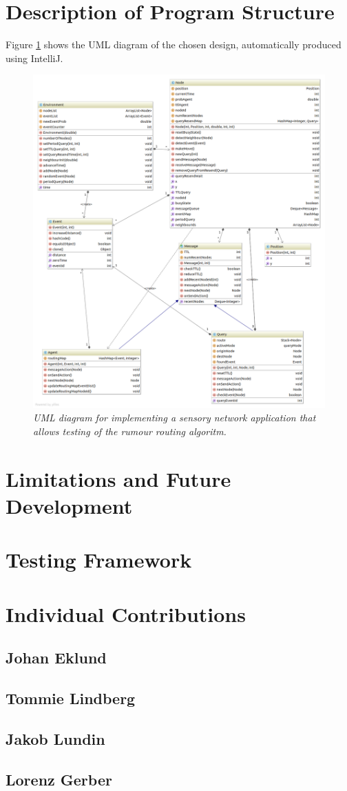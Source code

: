 \documentclass[a4paper,11pt,twoside]{article}
\begin{document}
\section{Description of Program Structure}

Figure \ref{fig:uml} shows the UML diagram of the chosen design,
automatically produced using IntelliJ.
\begin{figure}
\centering
\includegraphics[width=\textwidth]{uml.png}
\caption{\textit{UML diagram for implementing a sensory network application
  that allows testing of the rumour routing algoritm.}}
\label{fig:uml}
\end{figure}



\section{Limitations and Future Development}

\section{Testing Framework}


\section{Individual Contributions}
\subsection{Johan Eklund}
\subsection{Tommie Lindberg}
\subsection{Jakob Lundin}
\subsection{Lorenz Gerber}


\end{document}
